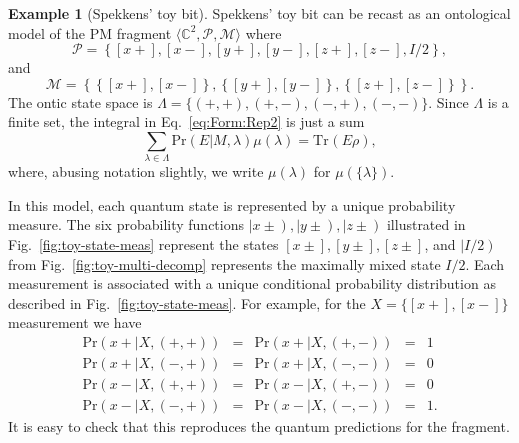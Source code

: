 \documentclass[DIV=calc,paper=a4,fontsize=11pt,twocolumn]{scrartcl} %
\theoremstyle{definition}
\newtheorem{example}[definition]{Example}
\theoremstyle{plain}
\newcommand{\RKet}[1]{\ensuremath{\left \vert #1 \right )}}
\newcommand{\Proj}[1]{\ensuremath{\left [ #1 \right ]}}
\newcommand{\Tr}[2][]{\ensuremath{\text{Tr}_{#1} \left ( #2 \right )}}
\begin{document}
\begin{example}[Spekkens' toy bit]
\label{exa:EOM:spek}
Spekkens' toy bit can be recast as an ontological model of the
PM fragment $\langle \mathbb{C}^2, \mathcal{P},
\mathcal{M} \rangle$ where
\begin{equation}
\mathcal{P} = \left \{\Proj{x+},\Proj{x-}, \Proj{y+},\Proj{y-},
\Proj{z+},\Proj{z-},I/2 \right \},
\end{equation}
and
\begin{equation}
\mathcal{M} = \left \{ \left \{ \Proj{x+},\Proj{x-} \right \},
\left \{\Proj{y+},\Proj{y-} \right \}, \left \{
\Proj{z+},\Proj{z-} \right \} \right \}.
\end{equation}
The ontic state space is $\Lambda = \{(+,+),(+,-),(-,+),(-,-)\}$.
Since $\Lambda$ is a finite set, the integral in
Eq.~\eqref{eq:Form:Rep2} is just a sum
\begin{equation}
\sum_{\lambda \in \Lambda} \text{Pr}(E|M,\lambda)\mu(\lambda) =
\Tr{E \rho},
\end{equation}
where, abusing notation slightly, we write $\mu(\lambda)$ for
$\mu(\{\lambda\})$.

In this model, each quantum state is represented by a unique
probability measure.  The six probability functions $\RKet{x \pm},
\RKet{y \pm}, \RKet{z \pm}$ illustrated in
Fig.~\ref{fig:toy-state-meas} represent the states $\Proj{x \pm},
\Proj{y \pm}, \Proj{z \pm}$, and $\RKet{I/2}$ from
Fig.~\ref{fig:toy-multi-decomp} represents the maximally mixed state
$I/2$.  Each measurement is associated with a unique conditional
probability distribution as described in
Fig.~\ref{fig:toy-state-meas}.  For example, for the $X =
\{\Proj{x+},\Proj{x-}\}$ measurement we have
\begin{equation}
\begin{array}{lllll}
\text{Pr}(x+|X,(+,+)) & = & \text{Pr}(x+|X,(+,-)) & = & 1 \\
\text{Pr}(x+|X,(-,+)) & = & \text{Pr}(x+|X,(-,-)) & = & 0 \\
\text{Pr}(x-|X,(+,+)) & = & \text{Pr}(x-|X,(+,-)) & = & 0 \\
\text{Pr}(x-|X,(-,+)) & = & \text{Pr}(x-|X,(-,-)) & = & 1.
\end{array}
\end{equation}
It is easy to check that this reproduces the quantum predictions for
the fragment.
\end{example}
\end{document}
